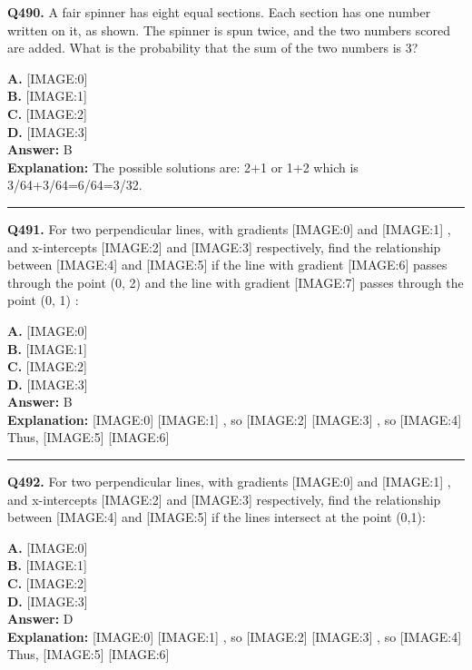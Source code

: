 \documentclass[12pt]{article}
\begin{document}
\noindent
\textbf{Q490.} A fair spinner has eight equal sections. Each section has one number written on it, as shown.
The spinner is spun twice, and the two numbers scored are added. What is the probability that the sum of the two numbers is 3?



\textbf{A.} [IMAGE:0] \\
\textbf{B.} [IMAGE:1] \\
\textbf{C.} [IMAGE:2] \\
\textbf{D.} [IMAGE:3] \\

\textbf{Answer:} B \\
\textbf{Explanation:} The possible solutions are: 2+1 or 1+2 which is 3/64+3/64=6/64=3/32.

\hrule
\vspace{1em}


\noindent
\textbf{Q491.} For two perpendicular lines, with gradients
[IMAGE:0]
and
[IMAGE:1]
, and x-intercepts
[IMAGE:2]
and
[IMAGE:3]
respectively, find the relationship between
[IMAGE:4]
and
[IMAGE:5]
if the line with gradient
[IMAGE:6]
passes through the point (0, 2) and the line with gradient
[IMAGE:7]
passes through the point (0, 1) :



\textbf{A.} [IMAGE:0] \\
\textbf{B.} [IMAGE:1] \\
\textbf{C.} [IMAGE:2] \\
\textbf{D.} [IMAGE:3] \\

\textbf{Answer:} B \\
\textbf{Explanation:} [IMAGE:0]
[IMAGE:1]
, so
[IMAGE:2]
[IMAGE:3]
, so
[IMAGE:4]
Thus,
[IMAGE:5]
[IMAGE:6]

\hrule
\vspace{1em}


\noindent
\textbf{Q492.} For two perpendicular lines, with gradients
[IMAGE:0]
and
[IMAGE:1]
, and x-intercepts
[IMAGE:2]
and
[IMAGE:3]
respectively, find the relationship between
[IMAGE:4]
and
[IMAGE:5]
if the lines intersect at the point (0,1):



\textbf{A.} [IMAGE:0] \\
\textbf{B.} [IMAGE:1] \\
\textbf{C.} [IMAGE:2] \\
\textbf{D.} [IMAGE:3] \\

\textbf{Answer:} D \\
\textbf{Explanation:} [IMAGE:0]
[IMAGE:1]
, so
[IMAGE:2]
[IMAGE:3]
, so
[IMAGE:4]
Thus,
[IMAGE:5]
[IMAGE:6]
\end{document}
